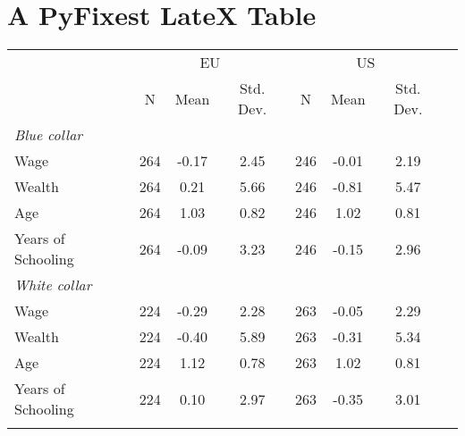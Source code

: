 \documentclass{article}%
\begin{document}
%
\normalsize%
\section{A PyFixest LateX Table}%
\label{sec:APyFixestLateXTable}%


\begin{table}[htbp]%
\renewcommand\cellalign{t}
\begin{threeparttable}
\begin{tabular}{lccccccc}
\toprule
 & \multicolumn{3}{c}{EU} & \multicolumn{3}{c}{US} \\
\cmidrule(lr){2-4} \cmidrule(lr){5-7}
 & N & Mean & Std. Dev. & N & Mean & Std. Dev. \\
\midrule
\addlinespace
\emph{Blue collar} \\
\addlinespace
Wage & 264 & -0.17 & 2.45 & 246 & -0.01 & 2.19 \\
Wealth & 264 & 0.21 & 5.66 & 246 & -0.81 & 5.47 \\
Age & 264 & 1.03 & 0.82 & 246 & 1.02 & 0.81 \\
Years of Schooling & 264 & -0.09 & 3.23 & 246 & -0.15 & 2.96 \\
\addlinespace
\midrule
\addlinespace
\emph{White collar} \\
\addlinespace
Wage & 224 & -0.29 & 2.28 & 263 & -0.05 & 2.29 \\
Wealth & 224 & -0.40 & 5.89 & 263 & -0.31 & 5.34 \\
Age & 224 & 1.12 & 0.78 & 263 & 1.02 & 0.81 \\
Years of Schooling & 224 & 0.10 & 2.97 & 263 & -0.35 & 3.01 \\
\addlinespace
\bottomrule
\end{tabular}
\footnotesize
\end{threeparttable}%
\end{table}

%
\end{document}
